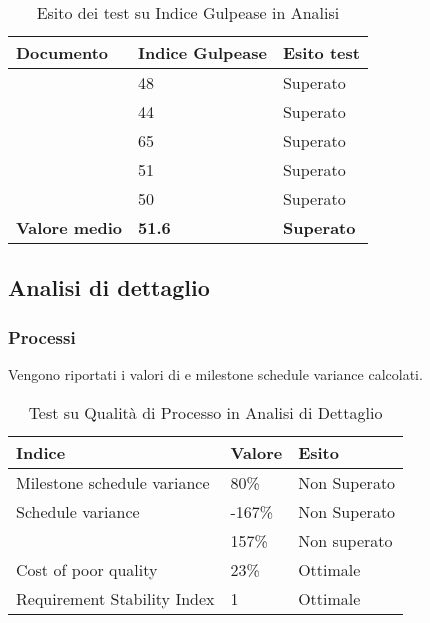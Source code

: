 \documentclass[12pt,a4paper]{article}
\begin{document}
\begin{table}[H]
	\begin{center}
		\begin{tabular}{p{} p{} p{}}
			\toprule
			\textbf{Documento}   & \textbf{Indice Gulpease}	& \textbf{Esito test} \\ \midrule
			\midrule
			\NdP & 48 &  Superato \\ \midrule
			\SdF & 44 &  Superato \\ \midrule
			\AdR & 65 &  Superato \\ \midrule
			\PdP & 51 &  Superato \\ \midrule
			\PdQ & 50 &  Superato \\ \midrule\midrule
			\textbf{Valore medio} & \textbf{51.6}& \textbf{Superato}\\ 	
			\bottomrule
		\end{tabular}
		\caption{Esito dei test su Indice Gulpease in Analisi}
	\end{center}
\end{table}
\subsection{Analisi di dettaglio}
\subsubsection{Processi}
Vengono riportati i valori di  e  milestone schedule variance calcolati. 

\begin{table}[H]
	\begin{center}
		\begin{tabular}{p{} p{} p{}}
			\toprule
			\textbf{Indice}   & \textbf{Valore}	& \textbf{Esito} \\ \midrule
			\midrule
			Milestone schedule variance & 80\% & Non Superato\\ \midrule
			Schedule variance & -167\% &  Non Superato\\ \midrule
			\mgls{cost variance} & 157\% &  Non superato \\ \midrule
			Cost of poor quality & 23\% &  Ottimale \\ \midrule
			Requirement Stability Index & 1 &  Ottimale \\ \bottomrule
		\end{tabular}
	\end{center}
	\caption{Test su Qualità di Processo in Analisi di Dettaglio}
\end{table}
\end{document}

